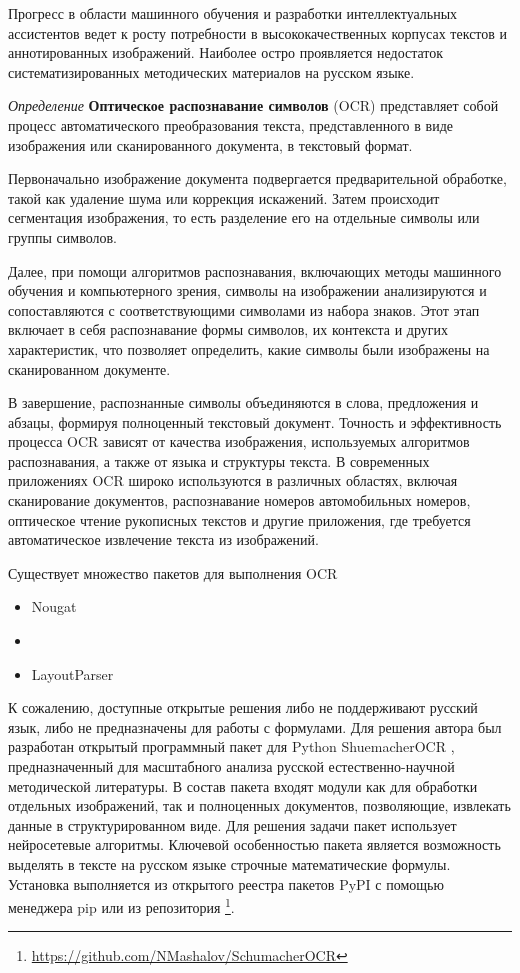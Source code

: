 Прогресс в области машинного обучения и разработки интеллектуальных ассистентов ведет к росту потребности в высококачественных корпусах текстов и аннотированных изображений.
 Наиболее остро проявляется недостаток систематизированных методических материалов на русском языке. 


\textit{Определение} \textbf{Оптическое распознавание символов} (OCR) представляет собой процесс автоматического преобразования текста,
 представленного в виде изображения или сканированного документа, в текстовый формат.
 
Первоначально изображение документа подвергается предварительной обработке, такой как удаление шума или коррекция искажений. 
Затем происходит сегментация изображения, то есть разделение его на отдельные символы или группы символов.

Далее, при помощи алгоритмов распознавания, включающих методы машинного обучения и компьютерного зрения, 
символы на изображении анализируются и сопоставляются с соответствующими символами из набора знаков. Этот этап включает в себя распознавание формы символов, их контекста и других характеристик, что позволяет определить, какие символы были изображены на сканированном документе.

В завершение, распознанные символы объединяются в слова, предложения и абзацы, формируя полноценный текстовый документ. Точность и эффективность процесса OCR зависят от качества изображения, используемых алгоритмов распознавания, а также от языка и структуры текста. В современных приложениях OCR широко используются в различных областях, включая сканирование документов, распознавание номеров автомобильных номеров, оптическое чтение рукописных текстов и другие приложения, где требуется автоматическое извлечение текста из изображений.

Существует множество пакетов для выполнения OCR \begin{itemize}
    \item Nougat  \cite{blecher2023nougat}
    \item \cite{smith2007overview}
    \item LayoutParser \cite{shen2021layoutparser}
\end{itemize}

К сожалению, доступные открытые решения либо не поддерживают русский язык, либо не предназначены для работы с формулами.
Для решения автора был разработан открытый программный пакет для Python ShuemacherOCR
, предназначенный для масштабного анализа русской естественно-научной методической литературы.
В состав пакета входят модули как для обработки отдельных изображений, 
так и полноценных документов, позволяющие, извлекать данные в структурированном виде. 
Для решения задачи пакет использует нейросетевые алгоритмы. 
Ключевой особенностью пакета  является возможность выделять в тексте на русском языке строчные математические формулы.
Установка выполняется из открытого реестра пакетов PyPI с помощью менеджера pip или
из репозитория \footnote{\url{https://github.com/NMashalov/SchumacherOCR}}. 

